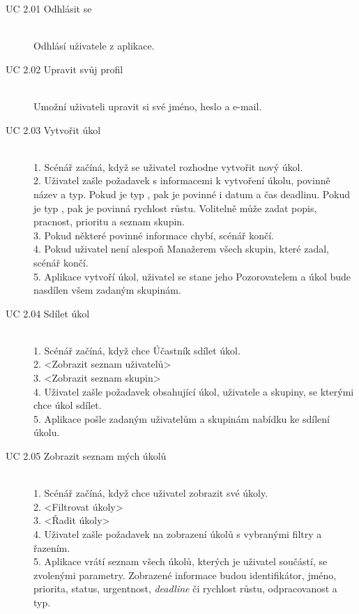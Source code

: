 \documentclass[thesis=B,czech]{FITthesis}[2012/06/26]
\begin{document}
			\begin{description}
				\item[UC 2.01 Odhlásit se] \hfill \\
					Odhlásí uživatele z aplikace. %
					
				\item[UC 2.02 Upravit svůj profil] \hfill \\
					Umožní uživateli upravit si své jméno, heslo a e-mail.
				
				\item[UC 2.03 Vytvořit úkol] \hfill \\
					1. Scénář začíná, když se uživatel rozhodne vytvořit nový úkol. \\
					2. Uživatel zašle požadavek s informacemi k vytvoření úkolu, povinně název a typ. Pokud je typ ,  pak je povinné i datum a čas deadlinu. Pokud je typ , pak je povinná rychlost růstu. Volitelně může zadat popis, pracnost, prioritu a seznam skupin. \\
					3. Pokud některé povinné informace chybí, scénář končí. \\
					4. Pokud uživatel není alespoň Manažerem všech skupin, které zadal, scénář končí. \\
					5. Aplikace vytvoří úkol, uživatel se stane jeho Pozorovatelem a úkol bude nasdílen všem zadaným skupinám. \\
				
				\item[UC 2.04 Sdílet úkol] \hfill \\
					1. Scénář začíná, když chce Účastník sdílet úkol. \\
					2. <Zobrazit seznam uživatelů> \\
					3. <Zobrazit seznam skupin> \\
					4. Uživatel zašle požadavek obsahující úkol, uživatele a skupiny, se kterými chce úkol sdílet. \\
					5. Aplikace pošle zadaným uživatelům a skupinám nabídku ke sdílení úkolu.
				
				\item[UC 2.05 Zobrazit seznam mých úkolů] \hfill \\
					1. Scénář začíná, když chce uživatel zobrazit své úkoly.\\
				    2. <Filtrovat úkoly> \\
				    3. <Řadit úkoly> \\
				    4. Uživatel zašle požadavek na zobrazení úkolů s vybranými filtry a řazením.\\
					5. Aplikace vrátí seznam všech úkolů, kterých je uživatel součástí, se zvolenými parametry. Zobrazené informace budou identifikátor, jméno, priorita, status, urgentnost, \textit{deadline} či rychlost růstu, odpracovanost a typ. \\
					

\end{description}
\end{document}
